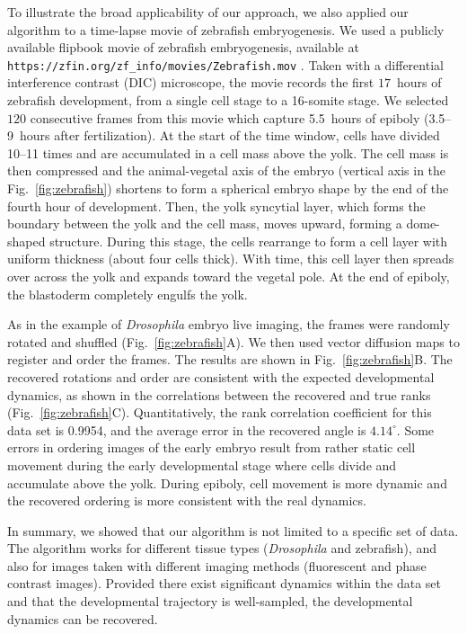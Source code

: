 \documentclass[twocolumn, 10pt]{article}
\newcommand{\fig}[0]{Fig.}
\begin{document}
To illustrate the broad applicability of our approach, we also applied our algorithm to a time-lapse movie  of zebrafish embryogenesis. 
%
We used a publicly available flipbook movie of zebrafish embryogenesis, available at \texttt{https://zfin.org/zf\_info/movies/Zebrafish.mov} \citep{karlstrom1996flipbook}.  
%
Taken with a differential interference contrast (DIC) microscope, the movie records the first $17$~hours of zebrafish development, from a single cell stage to a 16-somite stage. 
%
We selected $120$ consecutive frames from this movie which capture 5.5~hours of epiboly (3.5--9~hours after fertilization). 
%
At the start of the time window, cells have divided 10--11 times and are accumulated in a cell mass above the yolk. 
%
The cell mass is then compressed and the animal-vegetal axis of the embryo (vertical axis in the \fig~\ref{fig:zebrafish}) shortens to form a spherical embryo shape by the end of the fourth hour of development. 
%
Then, the yolk syncytial layer, which forms the boundary between the yolk and the cell mass, moves upward, forming a dome-shaped structure.  
%
During this stage, the cells rearrange to form a cell layer with uniform thickness (about four cells thick). 
%
With time, this cell layer then spreads over across the yolk and expands toward the vegetal pole. 
%
At the end of epiboly, the blastoderm completely engulfs the yolk. 

As in the example of {\em Drosophila} embryo live imaging, the frames were randomly rotated and shuffled (\fig~\ref{fig:zebrafish}A). 
%
We then used vector diffusion maps to register and order the frames. 
%
The results are shown in \fig~\ref{fig:zebrafish}B. 
%
The recovered rotations and order are consistent with the expected developmental dynamics, as shown in the correlations between the recovered and true ranks (\fig~\ref{fig:zebrafish}C). 
%
Quantitatively, the rank correlation coefficient for this data set is 0.9954, and the average error in the recovered angle is $4.14^\circ$. 
%
Some errors in ordering images of the early embryo result from rather static cell movement during the early developmental stage where cells divide and accumulate above the yolk. 
%
During epiboly, cell movement is more dynamic and the recovered ordering is more consistent with the real dynamics.


In summary, we showed that our algorithm is not limited to a specific set of data. 
%
The algorithm works for different tissue types ({\em Drosophila} and zebrafish), and also for images taken with different imaging methods (fluorescent and phase contrast images).
%
Provided there exist significant dynamics within the data set and that the developmental trajectory is well-sampled, the developmental dynamics can be recovered.
\end{document}
